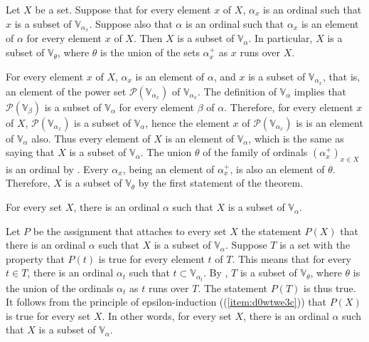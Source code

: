 \documentclass{article}
\begin{document}
\begin{theorem}
  \label{thm:qnvo8xw3}
  Let \(X\) be a set.  Suppose that for every element \(x\) of \(X\),
  \(\alpha_x\) is an ordinal such that \(x\) is a subset of
  \(\mathbb{V}_{\alpha_x}\).  Suppose also that \(\alpha\) is an
  ordinal such that \(\alpha_x\) is an element of \(\alpha\) for every
  element \(x\) of \(X\).  Then \(X\) is a subset of
  \(\mathbb{V}_\alpha\).  In particular, \(X\) is a subset of
  \(\mathbb{V}_\theta\), where \(\theta\) is the union of the sets
  \(\alpha_x^+\) as \(x\) runs over \(X\).
\end{theorem}

For every element \(x\) of \(X\), \(\alpha_x\) is an element of
\(\alpha\), and \(x\) is a subset of \(\mathbb{V}_{\alpha_x}\), that
is, an element of the power set \(\mathcal{P}(\mathbb{V}_{\alpha_x})\)
of \(\mathbb{V}_{\alpha_x}\).  The definition of \(\mathbb{V}_\alpha\)
implies that \(\mathcal{P}(\mathbb{V}_\beta)\) is a subset of
\(\mathbb{V}_\alpha\) for every element \(\beta\) of \(\alpha\).
Therefore, for every element \(x\) of \(X\),
\(\mathcal{P}(\mathbb{V}_{\alpha_x})\) is a subset of
\(\mathbb{V}_\alpha\), hence the element \(x\) of
\(\mathcal{P}(\mathbb{V}_{\alpha_x})\) is is an element of
\(\mathbb{V}_\alpha\) also.  Thus every element of \(X\) is an element
of \(\mathbb{V}_\alpha\), which is the same as saying that \(X\) is a
subset of \(\mathbb{V}_\alpha\).  The union \(\theta\) of the family
of ordinals \((\alpha_x^+)_{x \in X}\) is an ordinal by
.  Every \(\alpha_x\), being an element of
\(\alpha_x^+\), is also an element of \(\theta\).  Therefore, \(X\) is
a subset of \(\mathbb{V}_\theta\) by the first statement of the
theorem.

\begin{theorem}
  \label{thm:clbnmlzc}
  For every set \(X\), there is an ordinal \(\alpha\) such that \(X\)
  is a subset of \(\mathbb{V}_\alpha\).
\end{theorem}

Let \(P\) be the assignment that attaches to every set \(X\) the
statement \(P(X)\) that there is an ordinal \(\alpha\) such that \(X\)
is a subset of \(\mathbb{V}_\alpha\).  Suppose \(T\) is a set with the
property that \(P(t)\) is true for every element \(t\) of \(T\).  This
means that for every \(t \in T\), there is an ordinal \(\alpha_t\)
such that \(t \subset \mathbb{V}_{\alpha_t}\).  By
, \(T\) is a subset of \(\mathbb{V}_\theta\), where
\(\theta\) is the union of the ordinals \(\alpha_t\) as \(t\) runs
over \(T\).  The statement \(P(T)\) is thus true.  It follows from the
principle of epsilon-induction
((\ref{item:d0wtwe3c})) that \(P(X)\) is true for
every set \(X\).  In other words, for every set \(X\), there is an
ordinal \(\alpha\) such that \(X\) is a subset of
\(\mathbb{V}_\alpha\).
\end{document}
